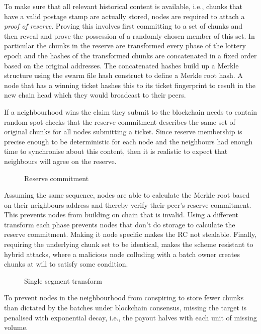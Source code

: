 To make sure that all relevant historical content is available, i.e., chunks that have a valid postage stamp are actually stored, nodes are required to attach 
a \emph{proof of reserve}. Proving this involves first committing to a set of chunks and then reveal and prove the possession of a randomly chosen member of this set. In particular the chunks in the reserve are transformed every phase of the lottery epoch and the hashes of the transformed chunks are concatenated in a fixed order based on the original addresses. The concatenated hashes build up a Merkle structure using the swarm file hash construct to define a Merkle root hash. A node that has a winning ticket hashes this to its ticket fingerprint to result in the new chain head which they would broadcast to their peers.

If a neighbourhood wins the claim they submit to the blockchain needs to contain random spot checks that the reserve commitment describes the same set of original chunks for all nodes submitting a ticket. 
Since reserve membership is precise enough to be deterministic for each node and the neighbours had enough time to synchronise about this content, then it is realistic to expect that neighbours will agree on the reserve.  

\begin{figure}[htbp]
\label{fig:rc}
  \centering
  \caption{Reserve commitment}
\end{figure}

Assuming the same sequence, nodes are able to calculate the Merkle root based on their neighbours address and thereby verify their peer's reserve commitment. This prevents nodes from building on chain that is invalid. Using a  different transform 
each phase prevents nodes that don't do storage to calculate the reserve commitment. Making it node specific makes the RC not stealable. Finally, requiring the underlying chunk set to be identical, makes the scheme resistant to hybrid attacks, where a malicious node colluding with a batch owner creates chunks at will to satisfy some condition.  

\begin{figure}[htbp]
\label{fig:sst}
  \centering
  \caption{Single segment transform}
\end{figure}

To prevent nodes in the neighbourhood from  conspiring to store fewer chunks than dictated by the batches under blockchain consensus, missing the target is penalised with exponential decay, i.e., the payout halves with each unit of missing volume.

